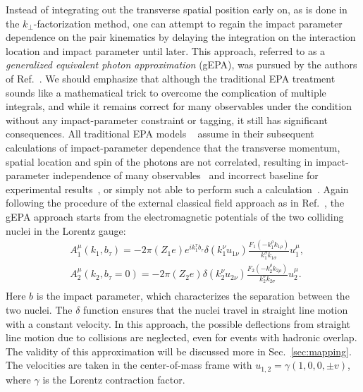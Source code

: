 \documentclass[12pt,epjc3]{svjour3}\sloppy
\begin{document}
\label{sec:theory}
Instead of integrating out the transverse spatial position early on, as is done in the $k_\perp$-factorization method, one can attempt to regain the impact parameter dependence on the pair kinematics by delaying the integration on the interaction location and impact parameter until later. This approach, referred to as a \textit{generalized equivalent photon approximation} (gEPA), was pursued by the authors of Ref.~\cite{zhaInitialTransversemomentumBroadening2020b}. We should emphasize that although the traditional EPA treatment sounds like a mathematical trick to overcome the complication of multiple integrals, and while it remains correct for many observables under the condition without any impact-parameter constraint or tagging, it still has significant consequences. All traditional EPA models ~\cite{kleinSTARlightMonteCarlo2017b,SuperChic3,Zha:2018tlq} assume in their subsequent calculations of impact-parameter dependence that the transverse momentum, spatial location and spin of the photons are not correlated, resulting in impact-parameter independence of many observables~\cite{kleinSTARlightMonteCarlo2017b} and incorrect baseline for experimental results~\cite{starcollaborationLowEnsuremathPair2018b,atlascollaborationObservationCentralityDependentAcoplanarity2018a}, or simply not able to perform such a calculation~\cite{SuperChic3}. 
Again following the procedure of the external classical field approach as in Ref.~\cite{PhysRevC.47.2308}, the gEPA approach starts from the electromagnetic potentials of the two colliding nuclei in the Lorentz gauge:
\begin{equation}
    \label{eq:external}
    \begin{split}
        &A_{1}^{\mu}(k_{1},b_{\tau})= -2 \pi (Z_{1} e) e^{ik_{1}^{\tau}b_{\tau}} \delta(k_{1}^{\nu}u_{1\nu}) \frac{F_{1}(-k_{1}^{\rho}k_{1\rho})}{k_{1}^{\sigma}k_{1\sigma}} u_{1}^{\mu},\\
        &A_{2}^{\mu}(k_{2},b_{\tau}=0)= -2 \pi (Z_{2} e) \delta(k_{2}^{\nu}u_{2\nu}) \frac{F_{2}(-k_{2}^{\rho}k_{2\rho})}{k_{2}^{\sigma}k_{2\sigma}} u_{2}^{\mu}.\\
    \end{split}
\end{equation}
Here $b$ is the impact parameter, which characterizes the separation between the two nuclei. The $\delta$ function ensures that the nuclei travel in straight line motion with a constant velocity. In this approach, the possible deflections from straight line motion due to collisions are neglected, even for events with hadronic overlap. The validity of this approximation will be discussed more in Sec.~\ref{sec:mapping}. The velocities are taken in the center-of-mass frame with $u_{1,2} = \gamma(1,0,0,\pm v)$, where $\gamma$ is the Lorentz contraction factor.
\end{document}
